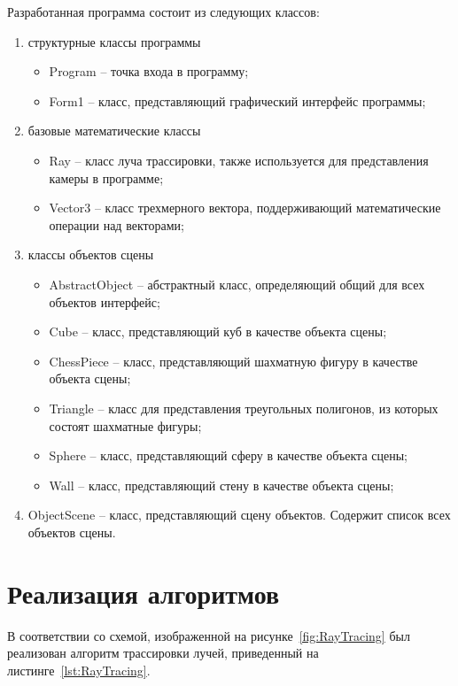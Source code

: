 Разработанная программа состоит из следующих классов:
\begin{enumerate}
	\item структурные классы программы
	\begin{itemize}
		\item Program -- точка входа в программу;
		\item Form1 -- класс, представляющий графический интерфейс программы;
	\end{itemize}
	\item базовые математические классы
	\begin{itemize}
		\item Ray -- класс луча трассировки, также используется для представления камеры в программе;
		\item Vector3 -- класс трехмерного вектора, поддерживающий математические операции над векторами;
	\end{itemize}
	\item классы объектов сцены
	\begin{itemize}
		\item AbstractObject -- абстрактный класс, определяющий общий для всех объектов интерфейс;
		\item Cube -- класс, представляющий куб в качестве объекта сцены;
		\item ChessPiece -- класс, представляющий шахматную фигуру в качестве объекта сцены;
		\item Triangle -- класс для представления треугольных полигонов, из которых состоят шахматные фигуры;
		\item Sphere -- класс, представляющий сферу в качестве объекта сцены;
		\item Wall -- класс, представляющий стену в качестве объекта сцены;
	\end{itemize}
	\item ObjectScene -- класс, представляющий сцену объектов. Содержит список всех объектов сцены.
\end{enumerate}

\section{Реализация алгоритмов}
В соответствии со схемой, изображенной на рисунке~\ref{fig:RayTracing} был реализован алгоритм трассировки лучей, приведенный на листинге~\ref{lst:RayTracing}.

